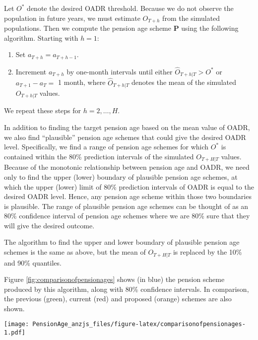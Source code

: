 \documentclass[
  doublespace]{anzsauth}
\providecommand{\tightlist}{%
  \setlength{\itemsep}{0pt}\setlength{\parskip}{0pt}}
\let\origfigure\figure
\let\endorigfigure\endfigure
\renewenvironment{figure}[1][2] {
    \expandafter\origfigure\expandafter[tbp]
} {
    \endorigfigure
}
\begin{document}
Let \(O^*\) denote the desired OADR threshold. Because we do not observe the population in future years, we must estimate \(O_{T+h}\) from the simulated populations. Then we compute the pension age scheme \(\bm{P}\) using the following algorithm. Starting with \(h=1\):

\begin{enumerate}
\def\labelenumi{\arabic{enumi}.}
\tightlist
\item
  Set \(a_{T+h}=a_{T+h-1}\).
\item
  Increment \(a_{T+h}\) by one-month intervals until either \(\widehat{O}_{T+h|T} > O^*\) or \(a_{T+1} - a_{T}=\) 1 month, where \(\widehat{O}_{T+h|T}\) denotes the mean of the simulated \(O_{T+h|T}\) values.
\end{enumerate}

We repeat these steps for \(h=2,\dots,H\).

In addition to finding the target pension age based on the mean value of OADR, we also find ``plausible'' pension age schemes that could give the desired OADR level. Specifically, we find a range of pension age schemes for which \(O^*\) is contained within the 80\% prediction intervals of the simulated \(O_{T+H|T}\) values. Because of the monotonic relationship between pension age and OADR, we need only to find the upper (lower) boundary of plausible pension age schemes, at which the upper (lower) limit of 80\% prediction intervals of OADR is equal to the desired OADR level. Hence, any pension age scheme within those two boundaries is plausible. The range of plausible pension age schemes can be thought of as an 80\% confidence interval of pension age schemes where we are 80\% sure that they will give the desired outcome.

The algorithm to find the upper and lower boundary of plausible pension age schemes is the same as above, but the mean of \(O_{T+H|T}\) is replaced by the 10\% and 90\% quantiles.

Figure \ref{fig:comparisonofpensionages} shows (in blue) the pension scheme produced by this algorithm, along with 80\% confidence intervals. In comparison, the previous (green), current (red) and proposed (orange) schemes are also shown.

\begin{figure}
\centering
\texttt{[image: PensionAge\_anzjs\_files/figure-latex/comparisonofpensionages-1.pdf]}
\caption{\label{fig:comparisonofpensionages}The target pension age scheme (in blue) along with the pension age schemes that have been set and proposed by the government. The blue shaded region shows 80\% confidence intervals for the target pension age.}
\end{figure}
\end{document}
